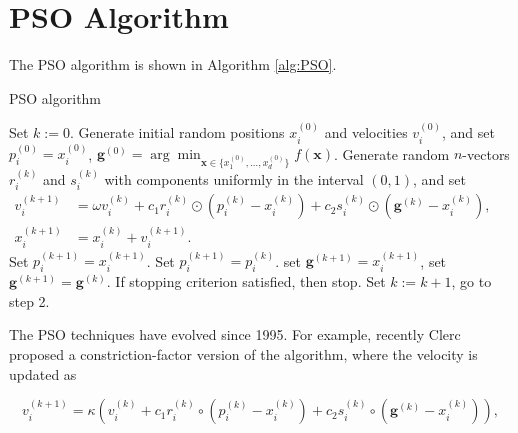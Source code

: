 \section{PSO Algorithm}

The PSO algorithm is shown in Algorithm \ref{alg:PSO}.

\begin{algorithm}
\caption{PSO algorithm}  \label{alg:PSO}
\begin{spacing}{1.5}
	\begin{algorithmic}[1]
		\State Set \( k := 0 \). 
			\State Generate initial random positions \( x_i^{(0)} \) and velocities \( v_i^{(0)} \), and set \( p_i^{(0)} = x_i^{(0)} \), \( \boldsymbol{g}^{(0)} = \arg \min_{\boldsymbol{x} \in \{x_1^{(0)}, \ldots, x_d^{(0)}\} } f(\boldsymbol{x}) \).
		\EndFor
			\State Generate random \( n \)-vectors \( r_i^{(k)} \) and \( s_i^{(k)} \) with components uniformly in the interval \((0, 1)\), and set
			\(\begin{aligned}
				v_i^{(k+1)} &= \omega v_i^{(k)} + c_1 r_i^{(k)} \odot (p_i^{(k)} - x_i^{(k)}) + c_2 s_i^{(k)} \odot (\boldsymbol{g}^{(k)} - x_i^{(k)}), \\
				x_i^{(k+1)} &= x_i^{(k)} + v_i^{(k+1)}.
			\end{aligned}
			\)
		\EndFor
				\State Set \( p_i^{(k+1)} = x_i^{(k+1)} \).
			\Else 
				\State Set \( p_i^{(k+1)} = p_i^{(k)} \).
			\EndIf
		\EndFor
			\State set \( \boldsymbol{g}^{(k+1)} = x_i^{(k+1)} \),
		\Else
			\State set \( \boldsymbol{g}^{(k+1)} = \boldsymbol{g}^{(k)} \).
		\EndIf
		\State If stopping criterion satisfied, then stop.
		\State Set \( k := k + 1 \), go to step 2.
	\end{algorithmic}
\end{spacing}
\end{algorithm}

The PSO techniques have evolved since 1995. For example, recently Clerc proposed a constriction-factor version of the algorithm, where the velocity is updated as

\[
	v_{i}^{(k+1)}=\kappa\left(v_{i}^{(k)}+c_{1} r_{i}^{(k)} \circ\left(p_{i}^{(k)}-x_{i}^{(k)}\right)+c_{2} s_{i}^{(k)} \circ\left(\boldsymbol{g}^{(k)}-x_{i}^{(k)}\right)\right),
\]

